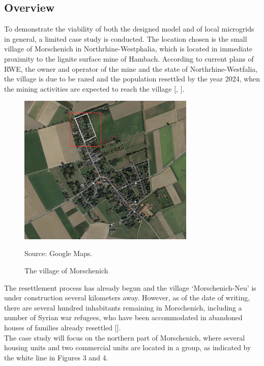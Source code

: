 \documentclass[
	11pt,								%
	DIV10,								%
	a4paper,         					%
	oneside,							%
	headheight=20pt,					%
	footheight=20pt,					%
    parskip=full,						%
    listof=totoc,						%
	bibliography=totoc,					%
	index=totoc,						%
]{scrartcl}
\begin{document}
\subsection{Overview}
To demonstrate the viability of both the designed model and of local microgrids in general, a limited case study is conducted. The location chosen is the small village of Morschenich in Northrhine-Westphalia, which is located in immediate proximity to the lignite surface mine of Hambach. According to current plans of RWE, the owner and operator of the mine and the state of Northrhine-Westfalia, the village is due to be razed and the population resettled by the year 2024, when the mining activities are expected to reach the village [\cite{RahmendatenMorschenichGemeinde2018}, \cite{UmsiedlungMorschenich}].
\begin{figure}[H]
	\centering
	\includegraphics[width=0.75\textwidth]{pictures/Morschenich.png}
	\caption{The village of Morschenich}
	\label{morschenich}
	\flushleft\quad\quad\footnotesize{Source: Google Maps.}
\end{figure}
The resettlement process has already begun and the village `Morschenich-Neu' is under construction several kilometers away. However, as of the date of writing, there are several hundred inhabitants remaining in Morschenich, including a number of Syrian war refugees, who have been accommodated in abandoned houses of families already  resettled [\cite{bauerAbgrundtief2018}].
\\
The case study will focus on the northern part of Morschenich, where several housing units and two commercial units are located in a group, as indicated by the white line in Figures 3 and 4. 
\end{document}
